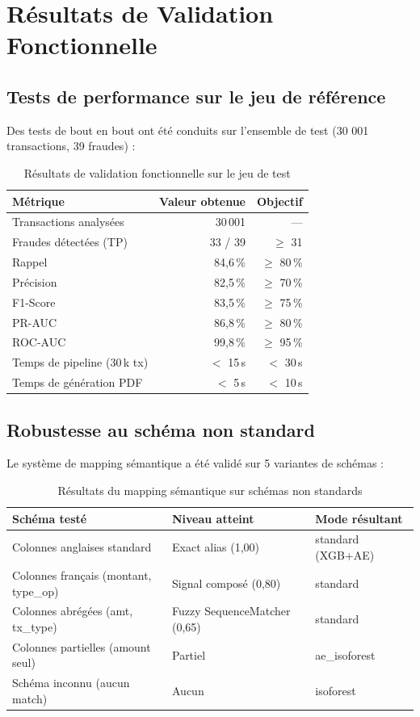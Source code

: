\documentclass[12pt,a4paper,twoside]{report}
\theoremstyle{definition}
\begin{document}
\section{Résultats de Validation Fonctionnelle}

\subsection{Tests de performance sur le jeu de référence}

Des tests de bout en bout ont été conduits sur l'ensemble de test
(30 001 transactions, 39 fraudes) :

\begin{table}[H]
\centering
\caption{Résultats de validation fonctionnelle sur le jeu de test}
\label{tab:e2e_results}
\renewcommand{\arraystretch}{1.3}
\begin{tabular}{lrr}
\toprule
\textbf{Métrique} & \textbf{Valeur obtenue} & \textbf{Objectif} \\
\midrule
Transactions analysées & 30\,001 & --- \\
Fraudes détectées (TP) & 33 / 39 & $\geq$ 31 \\
Rappel & 84,6\,\% & $\geq$ 80\,\% \\
Précision & 82,5\,\% & $\geq$ 70\,\% \\
F1-Score & 83,5\,\% & $\geq$ 75\,\% \\
PR-AUC & 86,8\,\% & $\geq$ 80\,\% \\
ROC-AUC & 99,8\,\% & $\geq$ 95\,\% \\
Temps de pipeline (30\,k tx) & $<$ 15\,s & $<$ 30\,s \\
Temps de génération PDF & $<$ 5\,s & $<$ 10\,s \\
\bottomrule
\end{tabular}
\end{table}

\subsection{Robustesse au schéma non standard}

Le système de mapping sémantique a été validé sur 5 variantes de schémas :

\begin{table}[H]
\centering
\caption{Résultats du mapping sémantique sur schémas non standards}
\label{tab:mapping_test}
\renewcommand{\arraystretch}{1.3}
\begin{tabular}{lll}
\toprule
\textbf{Schéma testé} & \textbf{Niveau atteint} & \textbf{Mode résultant} \\
\midrule
Colonnes anglaises standard & Exact alias (1,00) & standard (XGB+AE) \\
Colonnes français (montant, type\_op) & Signal composé (0,80) & standard \\
Colonnes abrégées (amt, tx\_type) & Fuzzy SequenceMatcher (0,65) & standard \\
Colonnes partielles (amount seul) & Partiel & ae\_isoforest \\
Schéma inconnu (aucun match) & Aucun & isoforest \\
\bottomrule
\end{tabular}
\end{table}
\end{document}
